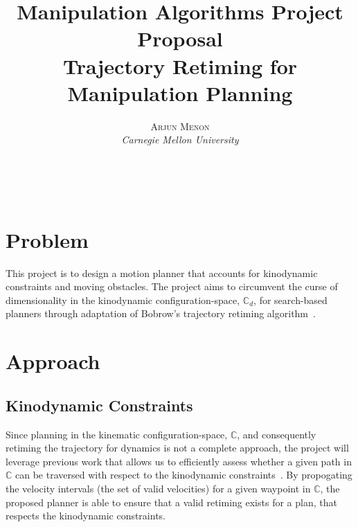 \documentclass[10pt]{article} %
\title{\textbf{Manipulation Algorithms Project Proposal}\\ %
Trajectory Retiming for Manipulation Planning} %
\author{\textsc{Arjun Menon} %
\\{\textit{Carnegie Mellon University}}} %
\makeatletter
\renewcommand{\maketitle}{ %
\begin{flushright} %
{\LARGE\@title} %

\vspace{10pt} %

{\large\@author} %
\\\@date %

\vspace{0pt} %
\end{flushright}
}
\makeatother
\begin{document}
\maketitle %



%
%
%


\section{Problem}

This project is to design a motion planner that accounts for kinodynamic constraints and moving obstacles. The project aims to circumvent the curse of dimensionality in the kinodynamic configuration-space, $\mathbb{C}_d$, for search-based planners through adaptation of Bobrow's trajectory retiming algorithm~\cite{bobrow1985time}.

\section{Approach}\label{sec:approach}

\subsection{Kinodynamic Constraints}\label{sec:constraints}

Since planning in the kinematic configuration-space, $\mathbb{C}$, and consequently retiming the trajectory for dynamics is not a complete approach, the project will leverage previous work that allows us to efficiently assess whether a given path in $\mathbb{C}$ can be traversed with respect to the kinodynamic constraints~\cite{pham2013velocity}. By propogating the velocity intervals (the set of valid velocities) for a given waypoint in $\mathbb{C}$, the proposed planner is able to ensure that a valid retiming exists for a plan, that respects the kinodynamic constraints.
\end{document}
